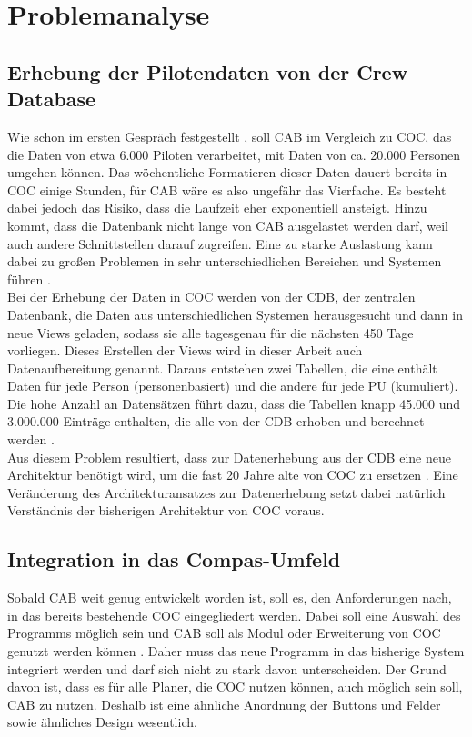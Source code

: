 \documentclass [12pt, a4paper, oneside, titlepage, ngerman]{article}
\begin{document}
\newpage

\section{Problemanalyse} \label{unterschiede}
\subsection{Erhebung der Pilotendaten von der Crew Database}
Wie schon im ersten Gespräch festgestellt \cite[vgl.][]{Gespraech1}, soll \ac{CAB} im Vergleich zu \ac{COC}, das die Daten von etwa 6.000 Piloten verarbeitet, mit Daten von ca. 20.000 Personen umgehen können. Das wöchentliche Formatieren dieser Daten dauert bereits in \ac{COC} einige Stunden, für \ac{CAB} wäre es also ungefähr das Vierfache. Es besteht dabei jedoch das Risiko, dass die Laufzeit eher exponentiell ansteigt. Hinzu kommt, dass die Datenbank nicht lange von \ac{CAB} ausgelastet werden darf, weil auch andere Schnittstellen darauf zugreifen. Eine zu starke Auslastung kann dabei zu großen Problemen in sehr unterschiedlichen Bereichen und Systemen führen \cite[vgl.][]{Gespraech1}. \\
Bei der Erhebung der Daten in \ac{COC} werden von der \ac{CDB}, der zentralen Datenbank, die Daten aus unterschiedlichen Systemen herausgesucht und dann in neue Views geladen, sodass sie alle tagesgenau für die nächsten 450 Tage vorliegen. Dieses Erstellen der Views wird in dieser Arbeit auch Datenaufbereitung genannt. Daraus entstehen zwei Tabellen, die eine enthält Daten für jede Person (personenbasiert) und die andere für jede PU (kumuliert). Die hohe Anzahl an Datensätzen führt dazu, dass die Tabellen knapp 45.000 und 3.000.000 Einträge enthalten, die alle von der \ac{CDB} erhoben und berechnet werden \cite[vgl.][]{Gespraech3}.  \\

\noindent Aus diesem Problem resultiert, dass zur Datenerhebung aus der \ac{CDB} eine neue Architektur benötigt wird, um die fast 20 Jahre alte von \ac{COC} zu ersetzen \cite[vgl.][]{Gespraech3}. Eine Veränderung des Architekturansatzes zur Datenerhebung setzt dabei natürlich Verständnis der bisherigen Architektur von \ac{COC} voraus.

\subsection{Integration in das Compas-Umfeld}
Sobald \ac{CAB} weit genug entwickelt worden ist, soll es, den Anforderungen nach, in das bereits bestehende \ac{COC} eingegliedert werden. Dabei soll eine Auswahl des Programms möglich sein und \ac{CAB} soll als Modul oder Erweiterung von \ac{COC} genutzt werden können \cite[vgl.][S.6]{anwenderkonzept}. Daher muss das neue Programm in das bisherige System integriert werden und darf sich nicht zu stark davon unterscheiden. Der Grund davon ist, dass es für alle Planer, die \ac{COC} nutzen können, auch möglich sein soll, \ac{CAB} zu nutzen. Deshalb ist eine ähnliche Anordnung der Buttons und Felder sowie ähnliches Design wesentlich. \\
\end{document}
